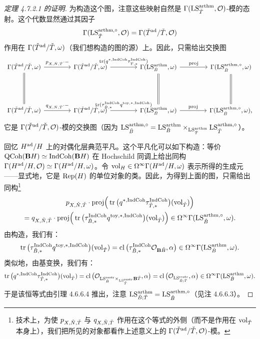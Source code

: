 \begin{proof}[定理 4.7.2.1 的证明]
为构造这个图，注意这些映射自然是 $\Gamma(\mathrm{LS}^{\mathrm{arthm}}_{\check{T}},\mathcal{O})$-模的态射。这个代数显然通过其因子
\[
  \Gamma(\mathrm{LS}^{\mathrm{arthm},\circ}_{\check{T}},\mathcal{O})=\Gamma(\check{T}^{\operatorname{ad}}/\check{T},\mathcal{O})
\]
作用在 $\Gamma(\check{T}^{\operatorname{ad}}/\check{T},\omega)$（我们想构造的图的源）上。因此，只需给出交换图
\[
\begin{tikzcd}[column sep=3.95em, row sep=4.4em, cells={font=\small}]
  \Gamma(\bT^{\ad}/\bT,\omega) \arrow[r, "p_{X,\bN,\bT}\cdot-"] \arrow[d, equal]
    & \Gamma(\bT^{\ad}/\bT,\omega) \arrow[r, "\tr(q^{*,\IndCoh}\tau_{\bT,*}^{\IndCoh})"]
    & \Gamma(\LS^{\arthm}_{\bB},\omega) \arrow[r, "\mathrm{proj}"] \arrow[d, equal]
    & \Gamma(\LS^{\arthm,\circ}_{\bB},\omega) \arrow[d, equal]\\
  \Gamma(\bT^{\ad}/\bT,\omega) \arrow[r, "q_{X,\bN,\bT}\cdot-"]
    & \Gamma(\bT^{\ad}/\bT,\omega) \arrow[r, "\tr(\tau_{\bB,*}^{\IndCoh}q^{\mathrm{toy},*,\IndCoh})"]
    & \Gamma(\LS^{\arthm}_{\bB},\omega) \arrow[r, "\mathrm{proj}"]
    & \Gamma(\LS^{\arthm,\circ}_{\bB},\omega),
\end{tikzcd}
\]
它是 $\Gamma(\check{T}^{\operatorname{ad}}/\check{T},\mathcal{O})$-模的交换图（因为
$\mathrm{LS}^{\mathrm{arthm},\circ}_{\check{B}}=\mathrm{LS}^{\mathrm{arthm}}_{\check{B}}\times_{\mathrm{LS}^{\mathrm{arthm}}_{\check{T}}}\mathrm{LS}^{\mathrm{arthm},\circ}_{\check{T}}$）。

回忆 $H^{\operatorname{ad}}/H$ 上的对偶化层典范平凡。这个平凡化可以如下构造：等价 $\mathrm{QCoh}(\mathbf{B}H)\simeq\mathrm{IndCoh}(\mathbf{B}H)$ 在 Hochschild 同调上给出同构
$\Gamma(H^{\operatorname{ad}}/H,\mathcal{O})\simeq\Gamma(H^{\operatorname{ad}}/H,\omega)$。令
$\operatorname{vol}_H\in\Omega^\infty\Gamma(H^{\operatorname{ad}}/H,\omega)$ 表示所得的生成元——显式地，它是 $\mathrm{Rep}(H)$ 的单位对象的类。因此，为得到上面的图，只需给出同构\footnote{技术上，为使 $p_{X,\check{N},\check{T}}$ 与 $q_{X,\check{N},\check{T}}$ 作用在这个等式的外侧（而不是作用在 $\operatorname{vol}_{\check{T}}$ 本身上），我们把所见的对象都看作上述意义上的 $\Gamma(\check{T}^{\operatorname{ad}}/\check{T},\mathcal{O})$-模。}
\[
\begin{gathered}
  p_{X,\check{N},\check{T}}\cdot\mathrm{proj}
  \Big(\operatorname{tr}\big(q^{*,\mathrm{IndCoh}}\tau_{\check{T},*}^{\mathrm{IndCoh}}\big)(\operatorname{vol}_{\check{T}})\Big)\\
  =q_{X,\check{N},\check{T}}\cdot\mathrm{proj}
  \Big(\operatorname{tr}\big(\tau_{\check{B},*}^{\mathrm{IndCoh}}q^{\mathrm{toy},*,\mathrm{IndCoh}}\big)(\operatorname{vol}_{\check{T}})\Big)
  \in\Omega^\infty\Gamma(\mathrm{LS}^{\mathrm{arthm},\circ}_{\check{B}},\omega).
\end{gathered}
\]
由构造，我们有：
\[
  \operatorname{tr}\big(\tau_{\check{B},*}^{\mathrm{IndCoh}}q^{\mathrm{toy},*,\mathrm{IndCoh}}\big)(\operatorname{vol}_{\check{T}})
  =\operatorname{cl}\big(\tau_{\check{B},*}^{\mathrm{IndCoh}}\mathcal{O}_{\mathbf{B}\check{B}},\alpha\big)
  \in\Omega^\infty\Gamma(\mathrm{LS}^{\mathrm{arthm}}_{\check{B}},\omega).
\]
类似地，由基变换，我们有：
\[
  \operatorname{tr}\big(q^{*,\mathrm{IndCoh}}\tau_{\check{T},*}^{\mathrm{IndCoh}}\big)(\operatorname{vol}_{\check{T}})
  =\operatorname{cl}\big(\mathcal{O}_{\mathrm{LS}^{\mathrm{restr}}_{\check{B}}\times_{\mathrm{LS}^{\mathrm{restr}}_{\check{T}}}\mathbf{B}\check{T}},\alpha\big)
  =\operatorname{cl}\big(\mathcal{O}_{\mathrm{LS}^{\mathrm{restr}}_{\check{B};\check{T}}},\alpha\big)
  \in\Omega^\infty\Gamma(\mathrm{LS}^{\mathrm{arthm}}_{\check{B}},\omega).
\]
于是该恒等式由引理 4.6.6.4 推出，注意
$\mathrm{LS}^{\mathrm{arthm}}_{\check{B};\check{T}}=\mathrm{LS}^{\mathrm{arthm},\circ}_{\check{B}}$（见注 4.6.6.3）。


\end{proof}

